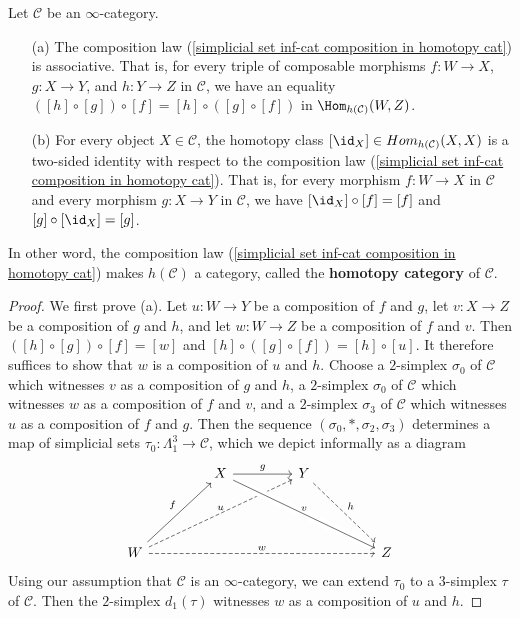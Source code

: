 \begin{proposition}\label{simplicial set inf-cat homotopy cat def}
Let $\mathcal{C}$ be an $\infty$-category.
\begin{itemize}
\item[(a)] The composition law (\ref{simplicial set inf-cat composition in homotopy cat}) is associative. That is, for every triple of composable morphisms $f:W\to X$, $g:X\to Y$, and $h:Y\to Z$ in $\mathcal{C}$, we have an equality $([h]\circ[g])\circ[f]=[h]\circ([g]\circ[f])$ in $\Hom_{h(\mathcal{C})}(W,Z)$.
\item[(b)] For every object $X\in\mathcal{C}$, the homotopy class $[\id_X]\in Hom_{h(\mathcal{C})}(X,X)$ is a two-sided identity with respect to the composition law (\ref{simplicial set inf-cat composition in homotopy cat}). That is, for every morphism $f:W\to X$ in $\mathcal{C}$ and every morphism $g:X\to Y$ in $\mathcal{C}$, we have $[\id_X]\circ[f]=[f]$ and $[g]\circ[\id_X]=[g]$.
\end{itemize}
In other word, the composition law (\ref{simplicial set inf-cat composition in homotopy cat}) makes $h(\mathcal{C})$ a category, called the \textbf{homotopy category} of $\mathcal{C}$.
\end{proposition}
\begin{proof}
We first prove (a). Let $u:W\to Y$ be a composition of $f$ and $g$, let $v:X\to Z$ be a composition of $g$ and $h$, and let $w:W\to Z$ be a composition of $f$ and $v$. Then $([h]\circ[g])\circ[f]=[w]$ and $[h]\circ([g]\circ[f])=[h]\circ[u]$. It therefore suffices to show that $w$ is a composition of $u$ and $h$. Choose a $2$-simplex $\sigma_0$ of $\mathcal{C}$ which witnesses $v$ as a composition of $g$ and $h$, a $2$-simplex $\sigma_0$ of $\mathcal{C}$ which witnesses $w$ as a composition of $f$ and $v$, and a $2$-simplex $\sigma_3$ of $\mathcal{C}$ which witnesses $u$ as a composition of $f$ and $g$. Then the sequence $(\sigma_0,\ast,\sigma_2,\sigma_3)$ determines a map of simplicial sets $\tau_0:\Lambda_1^3\to\mathcal{C}$, which we depict informally as a diagram
\[\begin{tikzcd}[row sep=15mm,column sep=15mm]
&X\ar[r,"g"]&Y\ar[rd,dashed,"h"]&\\
W\ar[ru,"f"]\ar[rru,dashed,"u"{anchor=south}]\ar[rrr,dashed,"w"]&&&Z\ar[llu,crossing over,leftarrow,swap,"v"{anchor=south}]
\end{tikzcd}\]
Using our assumption that $\mathcal{C}$ is an $\infty$-category, we can extend $\tau_0$ to a $3$-simplex $\tau$ of $\mathcal{C}$. Then the $2$-simplex $d_1(\tau)$ witnesses $w$ as a composition of $u$ and $h$.
\end{proof}
